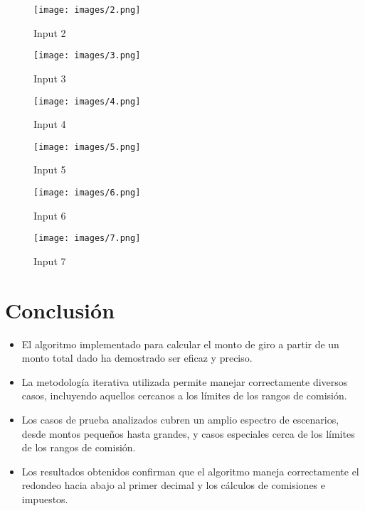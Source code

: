 \documentclass[11pt,a4paper]{article}
\begin{document}
\begin{figure}[H]
    \centering
    \texttt{[image: images/2.png]}
    \caption{Input 2}
    \label{fig:enter-label}
\end{figure}

\begin{figure}[H]
    \centering
    \texttt{[image: images/3.png]}
    \caption{Input 3}
    \label{fig:enter-label}
\end{figure}

\begin{figure}[H]
    \centering
    \texttt{[image: images/4.png]}
    \caption{Input 4}
    \label{fig:enter-label}
\end{figure}

\begin{figure}[H]
    \centering
    \texttt{[image: images/5.png]}
    \caption{Input 5}
    \label{fig:enter-label}
\end{figure}

\begin{figure}[H]
    \centering
    \texttt{[image: images/6.png]}
    \caption{Input 6}
    \label{fig:enter-label}
\end{figure}

\begin{figure}[H]
    \centering
    \texttt{[image: images/7.png]}
    \caption{Input 7}
    \label{fig:enter-label}
\end{figure}

\section{Conclusión}
\begin{itemize}
    \item El algoritmo implementado para calcular el monto de giro a partir de un monto total dado ha demostrado ser eficaz y preciso. 
    \item La metodología iterativa utilizada permite manejar correctamente diversos casos, incluyendo aquellos cercanos a los límites de los rangos de comisión.
    \item Los casos de prueba analizados cubren un amplio espectro de escenarios, desde montos pequeños hasta grandes, y casos especiales cerca de los límites de los rangos de comisión. 
    \item Los resultados obtenidos confirman que el algoritmo maneja correctamente el redondeo hacia abajo al primer decimal y los cálculos de comisiones e impuestos.
\end{itemize}
\end{document}
